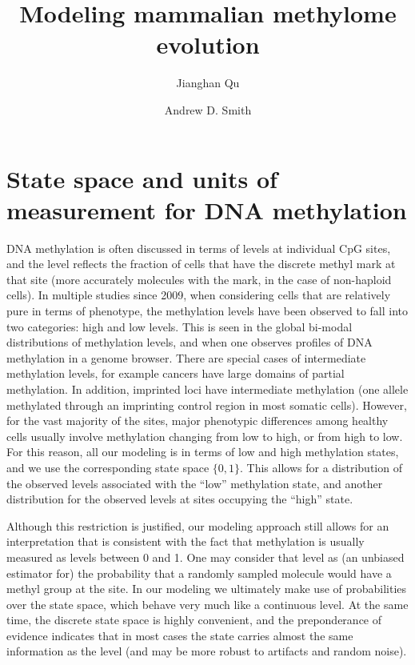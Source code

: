 \documentclass[11pt]{article}
\title{Modeling mammalian methylome evolution}
\date{}
\author[1]{Jianghan Qu }
\author[1]{Andrew D. Smith}
\affil[1]{Molecular and Computational Biology Section, Division
          of Biological Sciences, University of Southern California,
          Los Angeles, CA 90089, USA}
\theoremstyle{theorem}
\theoremstyle{proposition}
\begin{document}
\maketitle

\section{State space and units of measurement for DNA methylation}

DNA methylation is often discussed in terms of levels at individual
CpG sites, and the level reflects the fraction of cells that have the
discrete methyl mark at that site (more accurately molecules with the
mark, in the case of non-haploid cells). In multiple studies since
2009, when considering cells that are relatively pure in terms of
phenotype, the methylation levels have been observed to fall into two
categories: high and low levels. This is seen in the global bi-modal
distributions of methylation levels, and when one observes profiles of
DNA methylation in a genome browser. There are special cases of
intermediate methylation levels, for example cancers have large
domains of partial methylation. In addition, imprinted loci have
intermediate methylation (one allele methylated through an imprinting
control region in most somatic cells). However, for the vast majority
of the sites, major phenotypic differences among healthy cells usually
involve methylation changing from low to high, or from high to
low. For this reason, all our modeling is in terms of low and high
methylation states, and we use the corresponding state space $\{0,
1\}$. This allows for a distribution of the observed levels associated
with the ``low'' methylation state, and another distribution for the
observed levels at sites occupying the ``high'' state.

Although this restriction is justified, our modeling approach still
allows for an interpretation that is consistent with the fact that
methylation is usually measured as levels between 0 and 1. One may
consider that level as (an unbiased estimator for) the probability
that a randomly sampled molecule would have a methyl group at the
site. In our modeling we ultimately make use of probabilities over the
state space, which behave very much like a continuous level. At the
same time, the discrete state space is highly convenient, and the
preponderance of evidence indicates that in most cases the state
carries almost the same information as the level (and may be more
robust to artifacts and random noise).
\end{document}
